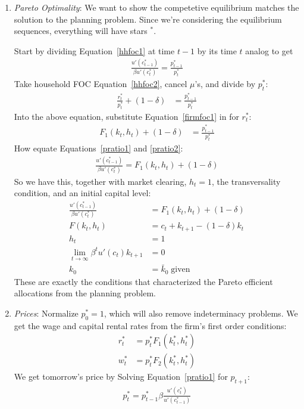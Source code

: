 \documentclass[12pt]{article}
\theoremstyle{plain}
\theoremstyle{definition}
\theoremstyle{remark}
\newcommand{\limt}{\lim_{t\rightarrow\infty}}
\begin{document}
\begin{enumerate}
  \item \emph{Pareto Optimality}: We want to show the competetive
    equilibrium matches the solution to the planning problem. Since
    we're considering the equilibrium sequences, everything will have
    stars ${}^*$.

    Start by dividing Equation~\ref{hhfoc1} at time $t-1$ by its time
    $t$ analog to get
    \begin{align}
      \frac{u'(c_{t-1}^*)}{\beta u'(c_{t}^*)} = \frac{p_{t-1}^*}{p_t^*}
      \label{pratio1}
    \end{align}
    Take household FOC Equation~\ref{hhfoc2}, cancel $\mu$'s, and divide
    by $p_t^*$:
    \begin{align*}
      \frac{r_t^*}{p_t^*} + (1-\delta)
      &= \frac{p_{t-1}^*}{p_t^*}
    \end{align*}
    Into the above equation, substitute Equation~\ref{firmfoc1} in for
    $r_t^*$:
    \begin{align}
      F_1(k_t,h_t) + (1-\delta)
      &= \frac{p_{t-1}^*}{p_t^*}
      \label{pratio2}
    \end{align}
    How equate Equations~\ref{pratio1} and \ref{pratio2}:
    \begin{align*}
      \frac{u'(c_{t-1}^*)}{\beta u'(c_{t}^*)}
      = F_1(k_t,h_t) + (1-\delta)
    \end{align*}
    So we have this, together with market clearing, $h_t=1$, the
    transversality condition, and an initial capital level:
    \begin{align*}
      \frac{u'(c_{t-1}^*)}{\beta u'(c_{t}^*)}
      &= F_1(k_t,h_t) + (1-\delta) \\
      F(k_t,h_t) &= c_t + k_{t+1} - (1-\delta) k_t \\
      h_t &= 1\\
      \limt \beta^t u'(c_t) k_{t+1}&=0\\
      k_0 &= \bar{k}_0 \; \text{given}
    \end{align*}
    These are exactly the conditions that characterized the Pareto
    efficient allocations from the planning problem.

  \item \emph{Prices}: Normalize $p_0^*=1$, which will also remove
    indeterminacy problems. We get the wage and capital rental rates
    from the firm's first order conditions:
    \begin{align*}
      r_t^* &= p_t^* F_1(k^*_t,h^*_t) \\
      w_t^* &= p_t^* F_2(k^*_t,h^*_t)
    \end{align*}
    We get tomorrow's price by Solving Equation~\ref{pratio1} for
    $p_{t+1}$:
    \begin{align}
       p_t^*
       = p_{t-1}^*\beta \frac{u'(c_{t}^*)}{u'(c_{t-1}^*)}
    \end{align}


\end{enumerate}
\end{document}
